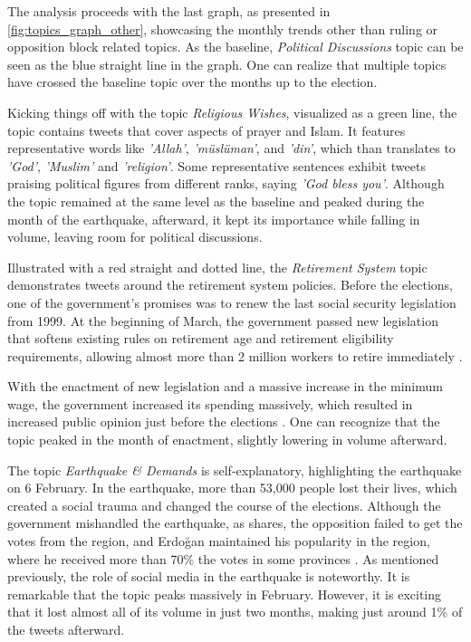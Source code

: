 The analysis proceeds with the last graph, as presented in \autoref{fig:topics_graph_other}, showcasing the 
monthly trends other than ruling or opposition block related topics. As the baseline, 
\textit{Political Discussions} topic can be seen as the blue straight line in the graph. 
One can realize that multiple topics have crossed the baseline topic over the months up to the election. 

Kicking things off with the topic \textit{Religious Wishes}, visualized as a green line, the topic contains 
tweets that cover aspects of prayer and Islam. It features representative words like \textit{'Allah'}, 
\textit{'müslüman'}, and \textit{'din'}, which than translates to \textit{'God'}, \textit{'Muslim'} and \textit{'religion'}. 
Some representative sentences exhibit tweets praising political figures from different ranks, 
saying \textit{'God bless you'}. 
Although the topic remained at the same level as the baseline and peaked during the month of the earthquake, 
afterward, it kept its importance while falling in volume, leaving room for political discussions.

Illustrated with a red straight and dotted line, the \textit{Retirement System} topic demonstrates tweets 
around the retirement system policies. Before the elections, one of the government's promises was to renew 
the last social security legislation from 1999. At the beginning of March, the government passed new legislation 
that softens existing rules on retirement age and retirement eligibility requirements, allowing almost more 
than 2 million workers to retire immediately \parencite{erdem_bisgin_retirement_2023}. 

With the enactment of new legislation and a massive increase in the minimum wage, the government increased its 
spending massively, which resulted in increased public opinion just before the elections 
\parencite{cevik_aksoy_turkey_earthquake_2023}. One can recognize that the topic peaked in the month of 
enactment, slightly lowering in volume afterward.

The topic \textit{Earthquake \& Demands} is self-explanatory, highlighting the earthquake on 6 February. 
In the earthquake, more than 53,000 people lost their lives, which created a social trauma and changed the 
course of the elections. Although the government mishandled the earthquake, as 
\textcite{cevik_aksoy_aydin_turkey_after_elections_2023} shares, the opposition failed to get the votes 
from the region, and Erdoğan maintained his popularity in the region, where he received more than 
70\% the votes in some provinces \parencite{michaelson_narli_earthquake_regions_erdogan_2023}.
As mentioned previously, the role of social media in the earthquake is noteworthy.
It is remarkable that the topic peaks massively in February. However, it is exciting that it lost almost 
all of its volume in just two months, making just around 
1\% of the tweets afterward. 

